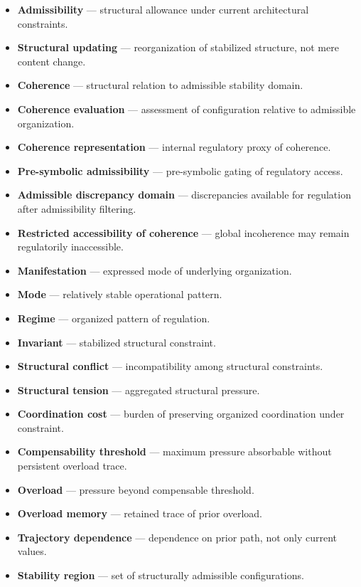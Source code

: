 \documentclass[11pt,a4paper]{article}
\begin{document}
	\begin{itemize}[leftmargin=2em]
		\item \textbf{Admissibility} --- structural allowance under current architectural constraints.
		\item \textbf{Structural updating} --- reorganization of stabilized structure, not mere content change.
		\item \textbf{Coherence} --- structural relation to admissible stability domain.
		\item \textbf{Coherence evaluation} --- assessment of configuration relative to admissible organization.
		\item \textbf{Coherence representation} --- internal regulatory proxy of coherence.
		\item \textbf{Pre-symbolic admissibility} --- pre-symbolic gating of regulatory access.
		\item \textbf{Admissible discrepancy domain} --- discrepancies available for regulation after admissibility filtering.
		\item \textbf{Restricted accessibility of coherence} --- global incoherence may remain regulatorily inaccessible.
		\item \textbf{Manifestation} --- expressed mode of underlying organization.
		\item \textbf{Mode} --- relatively stable operational pattern.
		\item \textbf{Regime} --- organized pattern of regulation.
		\item \textbf{Invariant} --- stabilized structural constraint.
		\item \textbf{Structural conflict} --- incompatibility among structural constraints.
		\item \textbf{Structural tension} --- aggregated structural pressure.
		\item \textbf{Coordination cost} --- burden of preserving organized coordination under constraint.
		\item \textbf{Compensability threshold} --- maximum pressure absorbable without persistent overload trace.
		\item \textbf{Overload} --- pressure beyond compensable threshold.
		\item \textbf{Overload memory} --- retained trace of prior overload.
		\item \textbf{Trajectory dependence} --- dependence on prior path, not only current values.
		\item \textbf{Stability region} --- set of structurally admissible configurations.

\end{itemize}
\end{document}
